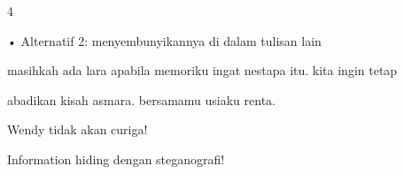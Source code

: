 \documentclass{article}
\begin{document}

4

• Alternatif 2: menyembunyikannya di dalam tulisan lain

 masihkah ada lara apabila memoriku ingat nestapa itu. kita ingin tetap 

abadikan kisah asmara. bersamamu usiaku renta.    

 Wendy tidak akan curiga!

  Information hiding dengan steganografi!
\end{document}
